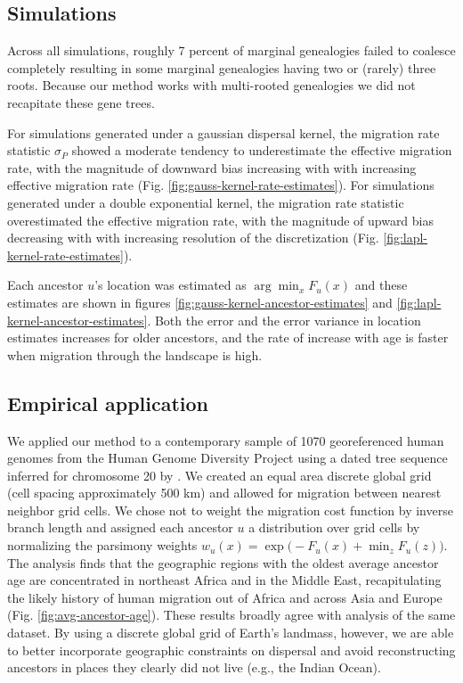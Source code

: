 \subsection{Simulations}

Across all simulations, roughly 7 percent of marginal genealogies failed to
coalesce completely resulting in some marginal genealogies having two or (rarely)
three roots. Because our method works with multi-rooted genealogies we did
not recapitate these gene trees.

For simulations generated under a gaussian dispersal kernel, the migration
rate statistic $\sigma_P$ showed a moderate tendency to underestimate the 
effective migration rate, with the magnitude of downward bias increasing with 
with increasing effective migration rate 
(Fig. \ref{fig:gauss-kernel-rate-estimates}). For simulations generated under
a double exponential kernel, the migration rate statistic overestimated the
effective migration rate, with the magnitude of upward bias decreasing with 
with increasing resolution of the discretization
(Fig. \ref{fig:lapl-kernel-rate-estimates}).

Each ancestor $u$'s location was estimated as $\arg\min_x F_u(x)$ and these
estimates are shown in figures \ref{fig:gauss-kernel-ancestor-estimates} and 
\ref{fig:lapl-kernel-ancestor-estimates}. Both the error and the error variance
in location estimates increases for older ancestors, and the rate of increase
with age is faster when migration through the landscape is high. 

\subsection{Empirical application}

We applied our method to a contemporary sample of 1070 georeferenced human
genomes from the Human Genome Diversity Project using a dated tree sequence
inferred for chromosome 20 by \citet{Wohns_etal_2022}. We created an equal 
area discrete global grid \citep{Barnes_Sahr_2023} (cell spacing approximately 
500 km) and allowed for migration between nearest neighbor grid cells. We
chose not to weight the migration cost function by inverse branch length and
assigned each ancestor $u$ a distribution over grid cells by normalizing the 
parsimony weights $w_u(x) = \exp\bigl(-F_u(x) + \min_z F_u(z)\bigr)$.
The analysis finds that the geographic regions with the oldest average ancestor
age are concentrated in northeast Africa and in the Middle East, recapitulating
the likely history of human migration out of Africa and across Asia and Europe 
(Fig. \ref{fig:avg-ancestor-age}). These results broadly agree with 
\citet{Wohns_etal_2022} analysis of the same dataset. By using a discrete global 
grid of Earth's landmass, however, we are able to better incorporate geographic
constraints on dispersal and avoid reconstructing ancestors in places they
clearly did not live (e.g., the Indian Ocean).
